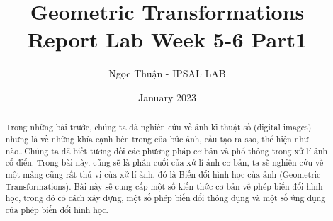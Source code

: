 \documentclass{article}
\title{Geometric Transformations\\ \Large Report Lab Week 5-6 Part1}
\author{Ngọc Thuận - IPSAL LAB}
\date{January 2023}
\begin{document}
\maketitle
\begin{abstract}
Trong những bài trước, chúng ta đã nghiên cứu về ảnh kĩ thuật số (digital images) nhưng là về những khía cạnh bên trong của bức ảnh, cấu tạo ra sao, thể hiện như nào\ldots Chúng ta đã biết tương đối các phương pháp cơ bản và phổ thông trong xử lí ảnh cổ điển. Trong bài này, cũng sẽ là phần cuối của xử lí ảnh cơ bản, ta sẽ nghiên cứu về một mảng cũng rất thú vị của xử lí ảnh, đó là Biến đổi hình học của ảnh (Geometric Transformations). Bài này sẽ cung cấp một số kiến thức cơ bản về phép biến đổi hình học, trong đó có cách xây dựng, một số phép biến đổi thông dụng và một số ứng dụng của phép biến đổi hình học.  
\end{abstract}
\tableofcontents
\newpage
\end{document}
